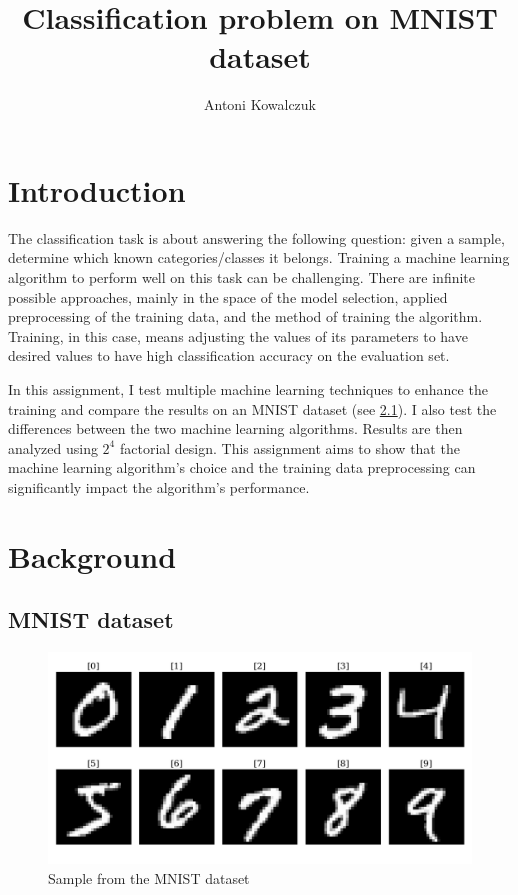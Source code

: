 \documentclass{article}
\title{Classification problem on MNIST dataset}
\author{
  Antoni Kowalczuk
}
\begin{document}
\maketitle

\section{Introduction}
The classification task is about answering the following question: given a sample, determine which known categories/classes it belongs. Training a machine learning algorithm to perform well on this task can be challenging. There are infinite possible approaches, mainly in the space of the model selection, applied preprocessing of the training data, and the method of training the algorithm. Training, in this case, means adjusting the values of its parameters to have desired values to have high classification accuracy on the evaluation set.

In this assignment, I test multiple machine learning techniques to enhance the training and compare the results on an MNIST dataset (see \ref{subsec:mnist}). I also test the differences between the two machine learning algorithms. Results are then analyzed using $2^4$ factorial design. This assignment aims to show that the machine learning algorithm's choice and the training data preprocessing can significantly impact the algorithm's performance.

\section{Background}

\subsection{MNIST dataset}
\label{subsec:mnist}

\begin{figure}[ht]
    \centering
    \includegraphics[width=\textwidth]{mnist.png}
    \caption{Sample from the MNIST dataset}
    \label{fig:mnist_sample}
\end{figure}
\end{document}
